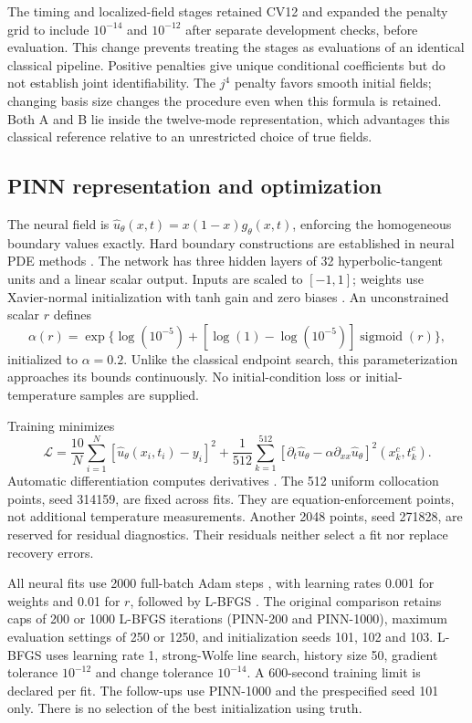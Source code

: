 \documentclass[11pt,a4paper]{article}
\begin{document}
The timing and localized-field stages retained CV12 and expanded the penalty grid to include $10^{-14}$ and $10^{-12}$ after separate development checks, before evaluation. This change prevents treating the stages as evaluations of an identical classical pipeline. Positive penalties give unique conditional coefficients but do not establish joint identifiability. The $j^4$ penalty favors smooth initial fields; changing basis size changes the procedure even when this formula is retained. Both A and B lie inside the twelve-mode representation, which advantages this classical reference relative to an unrestricted choice of true fields.

\subsection{PINN representation and optimization}
The neural field is $\widehat u_\theta(x,t)=x(1-x)g_\theta(x,t)$, enforcing the homogeneous boundary values exactly. Hard boundary constructions are established in neural PDE methods \citep{ref053}. The network has three hidden layers of 32 hyperbolic-tangent units and a linear scalar output. Inputs are scaled to $[-1,1]$; weights use Xavier-normal initialization with tanh gain and zero biases \citep{ref065}. An unconstrained scalar $r$ defines
\begin{equation}
 \alpha(r)=\exp\{\log(10^{-5})+[\log(1)-\log(10^{-5})]\operatorname{sigmoid}(r)\},
\end{equation}
initialized to $\alpha=0.2$. Unlike the classical endpoint search, this parameterization approaches its bounds continuously. No initial-condition loss or initial-temperature samples are supplied.

Training minimizes
\begin{equation}
 \mathcal L=\frac{10}{N}\sum_{i=1}^N[\widehat u_\theta(x_i,t_i)-y_i]^2
 +\frac{1}{512}\sum_{k=1}^{512}[\partial_t\widehat u_\theta-\alpha\partial_{xx}\widehat u_\theta]^2(x_k^c,t_k^c).
\end{equation}
Automatic differentiation computes derivatives \citep{ref066}. The 512 uniform collocation points, seed 314159, are fixed across fits. They are equation-enforcement points, not additional temperature measurements. Another 2048 points, seed 271828, are reserved for residual diagnostics. Their residuals neither select a fit nor replace recovery errors.

All neural fits use 2000 full-batch Adam steps \citep{ref060}, with learning rates 0.001 for weights and 0.01 for $r$, followed by L-BFGS \citep{ref061}. The original comparison retains caps of 200 or 1000 L-BFGS iterations (PINN-200 and PINN-1000), maximum evaluation settings of 250 or 1250, and initialization seeds 101, 102 and 103. L-BFGS uses learning rate 1, strong-Wolfe line search, history size 50, gradient tolerance $10^{-12}$ and change tolerance $10^{-14}$. A 600-second training limit is declared per fit. The follow-ups use PINN-1000 and the prespecified seed 101 only. There is no selection of the best initialization using truth.
\end{document}
